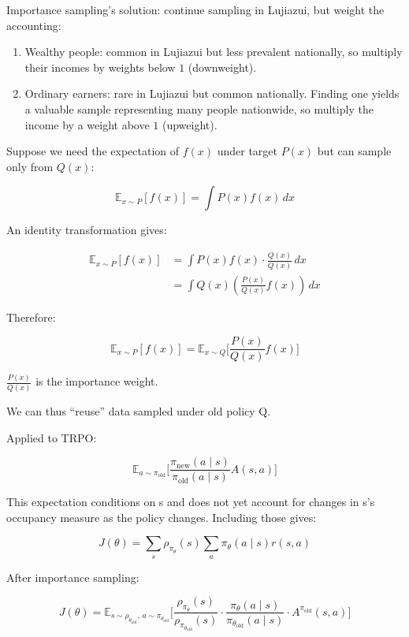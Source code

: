 Importance sampling's solution: continue sampling in Lujiazui, but weight the accounting:

\begin{enumerate}
\def\labelenumi{\arabic{enumi}.}
\tightlist
\item
  Wealthy people: common in Lujiazui but less prevalent nationally, so multiply their incomes by weights below \(1\) (downweight).
\item
  Ordinary earners: rare in Lujiazui but common nationally. Finding one yields a valuable sample representing many people nationwide, so multiply the income by a weight above \(1\) (upweight).
\end{enumerate}

Suppose we need the expectation of \(f(x)\) under target \(P(x)\) but can sample only from \(Q(x)\):

\[
\mathbb{E}_{x\sim P}[f(x)] = \int P(x)f(x)\,dx
\]

An identity transformation gives:

\[
\begin{aligned}
\mathbb{E}_{x\sim P}[f(x)]
&= \int P(x)f(x)\cdot \frac{Q(x)}{Q(x)}\,dx \\
&= \int Q(x)(\frac{P(x)}{Q(x)}f(x))\,dx
\end{aligned}
\]

Therefore:

\[
\mathbb{E}_{x\sim P}[f(x)]
=
\mathbb{E}_{x\sim Q}
\bigl[
\frac{P(x)}{Q(x)}f(x)
\bigr]
\]

\(\frac{P(x)}{Q(x)}\) is the importance weight.

We can thus ``reuse'' data sampled under old policy Q.

Applied to TRPO:

\[
\mathbb{E}_{a\sim\pi_{\mathrm{old}}}
\bigl[
\frac{\pi_{\mathrm{new}}(a\mid s)}{\pi_{\mathrm{old}}(a\mid s)}
A(s,a)
\bigr]
\]

This expectation conditions on s and does not yet account for changes in s's occupancy measure as the policy changes. Including those gives:

\[
J(\theta)=
\sum_s\rho_{\pi_\theta}(s)
\sum_a\pi_\theta(a\mid s)r(s,a)
\]

After importance sampling:

\[
J(\theta)=
\mathbb{E}_{s\sim\rho_{\theta_{\mathrm{old}}},\,a\sim\pi_{\theta_{\mathrm{old}}}}
\bigl[
\frac{\rho_{\pi_\theta}(s)}{\rho_{\pi_{\theta_{\mathrm{old}}}}(s)}
\cdot
\frac{\pi_\theta(a\mid s)}{\pi_{\theta_{\mathrm{old}}}(a\mid s)}
\cdot
A^{\pi_{\mathrm{old}}}(s,a)
\bigr]
\]

